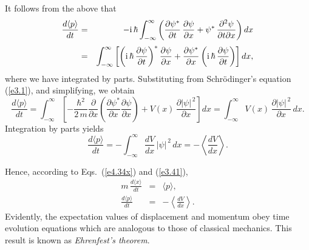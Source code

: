 It follows from the above that
\begin{eqnarray}
\frac{d\langle p\rangle}{dt} &=& -{\rm i}\,\hbar\int_{-\infty}^{\infty}
\left(\frac{\partial\psi^\ast}{\partial t}\,\frac{\partial\psi}{\partial x} + \psi^\ast\,\frac{\partial^2\psi}{\partial t\partial x}\right)dx\nonumber\\[0.5ex] &=& 
\int_{-\infty}^{\infty}\left[ \left({\rm i}\,\hbar\,\frac{\partial\psi}{\partial t}\right)^\ast\frac{\partial \psi}{\partial x} + \frac{\partial\psi^\ast}{\partial x}\left({\rm i}\,\hbar\,\frac{\partial\psi}{\partial t}\right)\right]dx,
\end{eqnarray}
where we have integrated by parts. 
Substituting from Schr\"{o}dinger's equation (\ref{e3.1}), and simplifying, we obtain
\begin{equation}
\frac{d\langle p\rangle}{dt} = \int_{-\infty}^{\infty}
\left[-\frac{\hbar^2}{2\,m}\frac{\partial}{\partial x}\!\left(\frac{\partial\psi^{\ast}}{\partial x}\frac{\partial \psi}{\partial x}\right) + V(x)\,\frac{\partial |\psi|^{\,2}}{\partial x}\right]dx = \int_{-\infty}^{\infty} V(x)\,\frac{\partial |\psi|^{\,2}}{\partial x}\,dx.
\end{equation}
Integration by parts yields
\begin{equation}\label{e3.41}
\frac{d\langle p\rangle}{dt} =-\int_{-\infty}^{\infty} \frac{dV}{dx}\,|\psi|^{\,2}\,dx =- \left\langle \frac{dV}{dx}\right\rangle.
\end{equation}

Hence, according to Eqs.~(\ref{e4.34x}) and (\ref{e3.41}),
\begin{eqnarray}\label{e3.42}
m\,\frac{d\langle x\rangle}{dt}&=& \langle p\rangle,\\[0.5ex]
\frac{d\langle p\rangle}{dt} &=& -\left\langle \frac{dV}{dx}\right\rangle.\label{e3.43}
\end{eqnarray}
Evidently, the expectation values of displacement and momentum obey
time evolution equations which are analogous to those of classical mechanics. 
This result is known as {\em Ehrenfest's theorem}.

